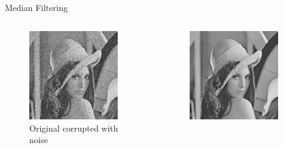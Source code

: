 \begin{frame}[c]{Median Filtering}
    \begin{columns}[c,onlytextwidth]
        \begin{column}{0.45\textwidth}\centering
            \begin{figure}[]
                \centering
                \includegraphics[width=0.9\textwidth]{img/lena_sp}
                \caption{Original corrupted with noise}%
                \label{fig:name}
            \end{figure}
        \end{column}
        \begin{column}{0.45\textwidth}\centering
            \begin{figure}[]
                \centering
                \includegraphics[width=0.9\textwidth]{img/lena_sp_median}

\end{figure}
\end{column}
\end{columns}
\end{frame}
